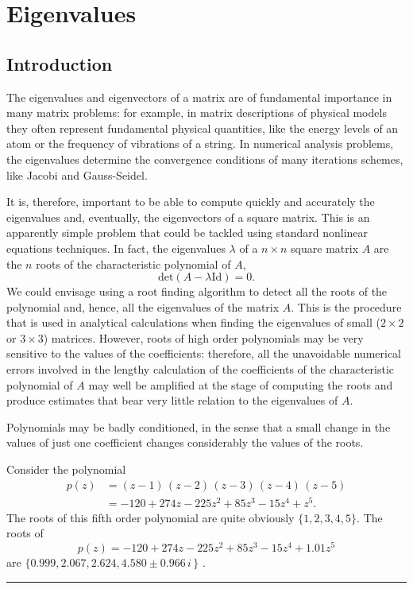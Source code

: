 
\chapter[Eigenvalues]{Eigenvalues}

\section{Introduction}

The eigenvalues and eigenvectors of a matrix are of fundamental
importance in many matrix problems: for example, in matrix
descriptions of physical models they often represent fundamental
physical quantities, like the energy levels of an atom or the
frequency of vibrations of a string.  In numerical analysis problems,
the eigenvalues determine the convergence conditions of many
iterations schemes, like Jacobi and Gauss-Seidel.

It is, therefore, important to be able to compute quickly and
accurately the eigenvalues and, eventually, the eigenvectors of a
square matrix.  This is an apparently simple problem that could be
tackled using standard nonlinear equations techniques.  In fact, the
eigenvalues $\lambda$ of a $n \times n$ square matrix $A$ are the $n$
roots of the characteristic polynomial of $A$,
%
\begin{equation*}
 \text{det}(A - \lambda \text{Id}) = 0 .
\end{equation*}
%
We could envisage using a root finding algorithm to detect all the
roots of the polynomial and, hence, all the eigenvalues of the matrix
$A$.  This is the procedure that is used in analytical calculations
when finding the eigenvalues of small ($2 \times 2$ or $3 \times 3$)
matrices.  However, roots of high order polynomials may be very
sensitive to the values of the coefficients: therefore, all the
unavoidable numerical errors involved in the lengthy calculation of
the coefficients of the characteristic polynomial of $A$ may well be
amplified at the stage of computing the roots and produce estimates
that bear very little relation to the eigenvalues of $A$.

\begin{Example}
  Polynomials may be badly conditioned, in the sense that a small
  change in the values of just one coefficient changes considerably
  the values of the roots.
\end{Example}

Consider the polynomial
%
\begin{align*}
 p(z) &= (z-1)\,(z-2)\,(z-3)\,(z-4)\,(z-5) \\
      &= -120 + 274 z - 225 z^2 + 85 z^3 - 15 z^4 + z^5 . 
\end{align*}
%
The roots of this fifth order polynomial are quite obviously
$\{1,2,3,4,5\}$.  The roots of
%
\begin{equation*}
  p(z) = -120 + 274 z - 225 z^2 + 85 z^3 - 15 z^4 + 1.01 z^5 
\end{equation*}
%
are $\{ 0.999, 2.067, 2.624, 4.580 \pm 0.966 \, i \, \}$ . \hfill
\rule{3mm}{3mm} 

